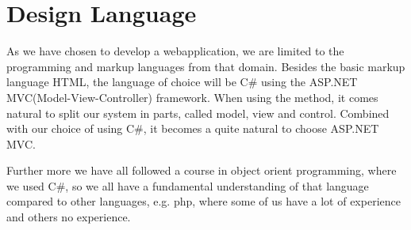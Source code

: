\section{Design Language}
\label{sec:design_language}
As we have chosen to develop a webapplication, we are limited to the programming and markup languages from that domain.
Besides the basic markup language HTML, the language of choice will be C\# using the ASP.NET MVC(Model-View-Controller) framework.
When using the \ooad method, it comes natural to split our system in parts, called model, view and control.
Combined with our choice of using C\#, it becomes a quite natural to choose ASP.NET MVC.

Further more we have all followed a course in object orient programming, where we used C\#, so we all have a fundamental understanding of that language compared to other languages, e.g. php, where some of us have a lot of experience and others no experience.
